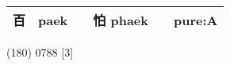 \documentclass[14pt,a4paper]{scrartcl}
\begin{document}
\begin{longtable}[c]{@{}llllll@{}}
\begin{minipage}[t]{0.14\columnwidth}
百
\strut\end{minipage} &
\begin{minipage}[t]{0.14\columnwidth}\raggedright\strut
paek
\strut\end{minipage} &
\begin{minipage}[t]{0.14\columnwidth}\raggedright\strut
\strut\end{minipage} &
\begin{minipage}[t]{0.14\columnwidth}\raggedright\strut
怕 phaek
\strut\end{minipage} &
\begin{minipage}[t]{0.14\columnwidth}\raggedright\strut
\strut\end{minipage} &
\begin{minipage}[t]{0.14\columnwidth}\raggedright\strut
pure:A
\strut\end{minipage}\tabularnewline
\bottomrule
\end{longtable}

(180) 0788 {[}3{]}
\end{document}
